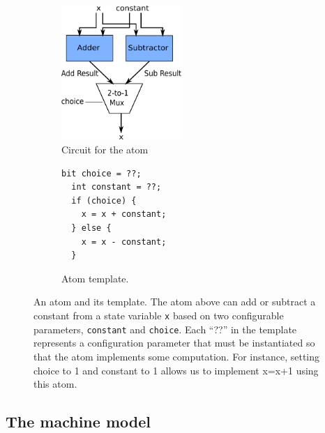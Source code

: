 
\begin{figure}[!t]
  \begin{subfigure}{0.5\columnwidth}
  \centering
  \includegraphics[width=0.5\textwidth]{domino_circuit.pdf}
  \caption{Circuit for the atom}
  \label{fig:alu_diag}
  \end{subfigure}
  \hspace{0.1\columnwidth}
  \begin{subfigure}{0.3\columnwidth}
  \begin{lstlisting}[belowskip=-0.8 \baselineskip]
  bit choice = ??;
  int constant = ??;
  if (choice) {
    x = x + constant;
  } else {
    x = x - constant;
  }
  \end{lstlisting}
  \hspace{0.1\columnwidth}
  \caption{Atom template.}
  \label{fig:alu_in_sketch}
  \end{subfigure}
  \caption{An atom and its template. The atom above can add or subtract a
constant from a state variable {\tt x} based on two configurable parameters,
{\tt constant} and {\tt choice}. Each ``??'' in the template represents a
configuration parameter that must be instantiated so that the atom implements
some computation. For instance, setting choice to 1 and constant to 1 allows us
to implement x=x+1 using this atom.}
  \label{fig:atom}
\end{figure}


\subsection{The \absmachine machine model}

